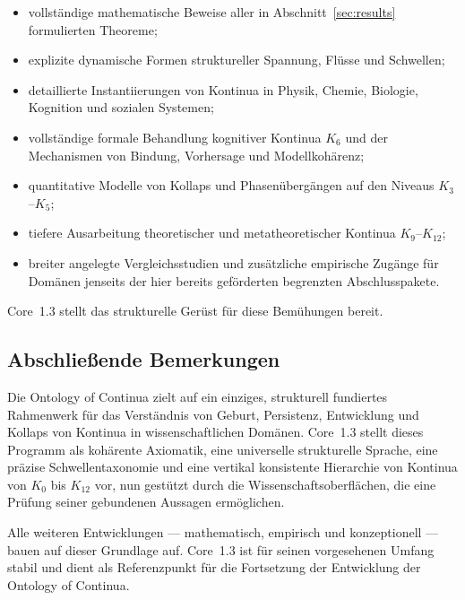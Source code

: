 \begin{itemize}
    \item vollständige mathematische Beweise aller in
          Abschnitt~\ref{sec:results} formulierten Theoreme;
    \item explizite dynamische Formen struktureller Spannung, Flüsse und
          Schwellen;
    \item detaillierte Instantiierungen von Kontinua in Physik, Chemie,
          Biologie, Kognition und sozialen Systemen;
    \item vollständige formale Behandlung kognitiver Kontinua \(K_6\) und der
          Mechanismen von Bindung, Vorhersage und Modellkohärenz;
    \item quantitative Modelle von Kollaps und Phasenübergängen auf den Niveaus
          \(K_3\)–\(K_5\);
    \item tiefere Ausarbeitung theoretischer und metatheoretischer Kontinua
          \(K_9\)–\(K_{12}\);
    \item breiter angelegte Vergleichsstudien und zusätzliche empirische
          Zugänge für Domänen jenseits der hier bereits geförderten begrenzten
          Abschlusspakete.
\end{itemize}

Core~1.3 stellt das strukturelle Gerüst für diese Bemühungen bereit.

\subsection{Abschließende Bemerkungen}

Die Ontology of Continua zielt auf ein einziges, strukturell fundiertes
Rahmenwerk für das Verständnis von Geburt, Persistenz, Entwicklung und Kollaps
von Kontinua in wissenschaftlichen Domänen.
Core~1.3 stellt dieses Programm als kohärente Axiomatik, eine universelle
strukturelle Sprache, eine präzise Schwellentaxonomie und eine vertikal
konsistente Hierarchie von Kontinua von \(K_0\) bis \(K_{12}\) vor,
nun gestützt durch die Wissenschaftsoberflächen, die eine Prüfung seiner
gebundenen Aussagen ermöglichen.

Alle weiteren Entwicklungen --- mathematisch, empirisch und konzeptionell ---
bauen auf dieser Grundlage auf. Core~1.3 ist für seinen vorgesehenen Umfang
stabil und dient als Referenzpunkt für die Fortsetzung der Entwicklung der
Ontology of Continua.
